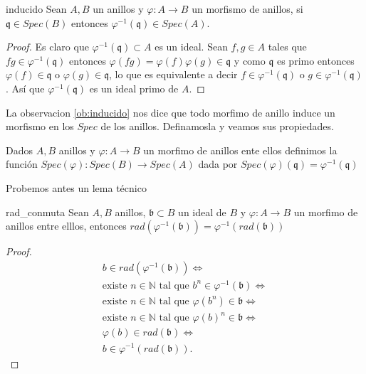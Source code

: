 \documentclass[14pt]{extarticle}
\begin{document}
\begin{observacion}{}{inducido}
    Sean $A, B$ un anillos y $\varphi:A\rightarrow B$ 
    un morfismo de anillos, si $\mathfrak{q}\in Spec(B)$
    entonces $\varphi^{-1}(\mathfrak{q}) \in Spec(A)$.
\end{observacion}
\begin{proof}
    Es claro que $\varphi^{-1}(\mathfrak{q})\subset A$
    es un ideal.
    Sean $f,g \in A$ tales que $fg\in \varphi^{-1}(\mathfrak{q})$
    entonces $\varphi(fg)=\varphi(f)\varphi(g)\in \mathfrak{q}$
    y como $\mathfrak{q}$ es primo entonces $\varphi(f)\in \mathfrak{q}$
    o $\varphi(g)\in \mathfrak{q}$, lo que es equivalente a decir 
    $f \in \varphi^{-1}(\mathfrak{q})$ o $g\in \varphi^{-1}(\mathfrak{q})$.
    Así que $\varphi^{-1}(\mathfrak{q})$ es un ideal primo de $A$.
\end{proof}

La observacion \ref{ob:inducido} nos dice que
todo morfimo de anillo induce un morfismo en
los $Spec$ de los anillos. Definamosla y veamos 
sus propiedades.

\begin{definicion}{}{}
    Dados $A, B$ anillos y $\varphi:A \rightarrow B$
    un morfimo de anillos ente ellos definimos la 
    función $Spec(\varphi):Spec(B)\rightarrow Spec(A)$
    dada por $Spec(\varphi)(\mathfrak{q})=\varphi^{-1}(\mathfrak{q})$
\end{definicion}

Probemos antes un lema técnico

\begin{lema}{}{rad_conmuta}
    Sean $A, B$ anillos, 
    $\mathfrak{b}\subset B$ un ideal de $B$
    y $\varphi:A\rightarrow B$
    un morfimo de anillos entre elllos,
    entonces $rad(\varphi^{-1}(\mathfrak{b}))
    = \varphi^{-1}(rad(\mathfrak{b}))$
\end{lema}
\begin{proof}
    \begin{align*}
        b\in rad(\varphi^{-1}(\mathfrak{b})) \iff\\
        \mbox{existe }n\in\mathbb{N} \mbox{ tal que }
        b^n \in \varphi^{-1}(\mathfrak{b}) \iff \\
        \mbox{existe }n\in\mathbb{N} \mbox{ tal que }
        \varphi(b^n)\in \mathfrak{b} \iff \\
        \mbox{existe }n\in\mathbb{N} \mbox{ tal que }
        \varphi(b)^n \in \mathfrak{b} \iff \\
        \varphi(b)\in rad(\mathfrak{b}) \iff \\
        b \in \varphi^{-1}(rad(\mathfrak{b})).
    \end{align*}
\end{proof}
\end{document}
